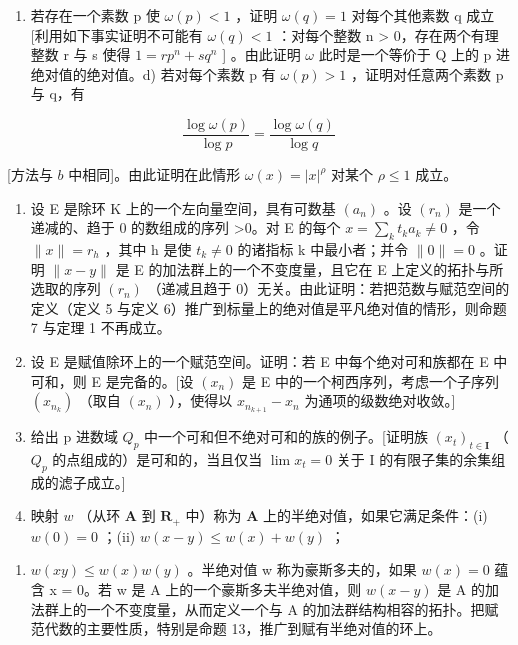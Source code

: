\begin{enumerate}
\def\labelenumi{\alph{enumi})}
\setcounter{enumi}{2}
\tightlist
\item
  若存在一个素数 p 使 \(\omega(p) < 1\) ，证明 \(\omega(q) = 1\) 对每个其他素数 q 成立{[}利用如下事实证明不可能有 \(\omega(q) < 1\) ：对每个整数 n \textgreater{} 0，存在两个有理整数 r 与 s 使得 \(1 = rp^{n} + sq^{n}\) {]} 。由此证明 \(\omega\) 此时是一个等价于 Q 上的 p 进绝对值的绝对值。d) 若对每个素数 p 有 \(\omega(p) > 1\) ，证明对任意两个素数 p 与 q，有
\end{enumerate}

\[
\frac {\log \omega (p)}{\log p} = \frac {\log \omega (q)}{\log q}
\]

{[}方法与 \(b\) 中相同{]}。由此证明在此情形 \(\omega(x) = |x|^{\rho}\) 对某个 \(\rho \leqslant 1\) 成立。

\begin{enumerate}
\def\labelenumi{\arabic{enumi})}
\setcounter{enumi}{5}
\item
  设 E 是除环 K 上的一个左向量空间，具有可数基 \((a_{n})\) 。设 \((r_{n})\) 是一个递减的、趋于 0 的数组成的序列 \textgreater0。对 E 的每个 \(x = \sum_{k} t_{k} a_{k} \neq 0\) ，令 \(\|x\| = r_{h}\) ，其中 h 是使 \(t_{k} \neq 0\) 的诸指标 k 中最小者；并令 \(\|0\| = 0\) 。证明 \(\|x - y\|\) 是 E 的加法群上的一个不变度量，且它在 E 上定义的拓扑与所选取的序列 \((r_{n})\) （递减且趋于 0）无关。由此证明：若把范数与赋范空间的定义（定义 5 与定义 6）推广到标量上的绝对值是平凡绝对值的情形，则命题 7 与定理 1 不再成立。
\item
  设 E 是赋值除环上的一个赋范空间。证明：若 E 中每个绝对可和族都在 E 中可和，则 E 是完备的。{[}设 \((x_{n})\) 是 E 中的一个柯西序列，考虑一个子序列 \((x_{n_{k}})\) （取自 \((x_{n})\) ），使得以 \(x_{n_{k+1}} - x_{n}\) 为通项的级数绝对收敛。{]}
\item
  给出 p 进数域 \(Q_{p}\) 中一个可和但不绝对可和的族的例子。{[}证明族 \((x_{t})_{t\in\mathbf{I}}\) （\(Q_{p}\) 的点组成的）是可和的，当且仅当 \(\lim x_{t}=0\) 关于 I 的有限子集的余集组成的滤子成立。{]}
\item
  映射 \(w\) （从环 \(\mathbf{A}\) 到 \(\mathbf{R}_+\) 中）称为 \(\mathbf{A}\) 上的半绝对值，如果它满足条件：(i) \(w(\mathrm{0}) = \mathrm{0}\) ；(ii) \(w(x - y) \leqslant w(x) + w(y)\) ；
\end{enumerate}

\begin{enumerate}
\def\labelenumi{(\roman{enumi})}
\setcounter{enumi}{2}
\tightlist
\item
  \(w(xy) \leqslant w(x)w(y)\) 。半绝对值 w 称为豪斯多夫的，如果 \(w(x) = 0\) 蕴含 x = 0。若 w 是 A 上的一个豪斯多夫半绝对值，则 \(w(x - y)\) 是 A 的加法群上的一个不变度量，从而定义一个与 A 的加法群结构相容的拓扑。把赋范代数的主要性质，特别是命题 13，推广到赋有半绝对值的环上。
\end{enumerate}


